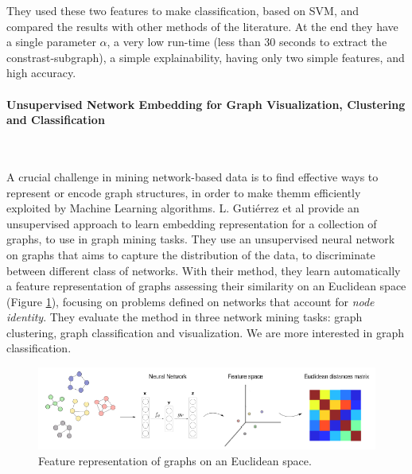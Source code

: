 They used these two features to make classification, based on SVM, and compared the results with other methods of the literature. At the end they have a single parameter $\alpha$, a very low run-time (less than 30 seconds to extract the constrast-subgraph), a simple explainability, having only two simple features, and high accuracy. 

\paragraph{Unsupervised Network Embedding for Graph Visualization, Clustering and Classification}\
\label{par:2}
\vspace{0.5cm}

A crucial challenge in mining network-based data is to find effective ways to represent or encode graph structures, in order to make themm efficiently exploited by Machine Learning algorithms. L. Gutiérrez et al \cite{GutierrezUn} provide an unsupervised approach to learn embedding representation for a collection of graphs, to use in graph mining tasks. They use an unsupervised neural network on graphs that aims to capture the distribution of the data, to discriminate between different class of networks. With their method, they learn automatically a feature representation of graphs assessing their similarity on an Euclidean space (Figure \ref{fig:diagram11}), focusing on problems defined on networks that account for \textit{node identity}. They evaluate the method in three network mining tasks: graph clustering, graph classification and visualization. We are more interested in graph classification.
\vspace{0.5cm}

\begin{figure}[htbp]
	\centering
	\includegraphics[scale=0.5]{Immagini/Unsupervised.PNG}
	\caption{Feature representation of graphs on an Euclidean space.}
	\label{fig:diagram11}
\end{figure}

